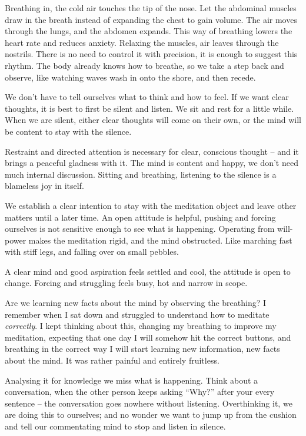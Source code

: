 Breathing in, the cold air touches the tip of the nose. Let the
abdominal muscles draw in the breath instead of expanding the chest to
gain volume. The air moves through the lungs, and the abdomen expands.
This way of breathing lowers the heart rate and reduces anxiety.
Relaxing the muscles, air leaves through the nostrils. There is no need
to control it with precision, it is enough to suggest this rhythm. The
body already knows how to breathe, so we take a step back and observe,
like watching waves wash in onto the shore, and then recede.

We don't have to tell ourselves what to think and how to feel. If we
want clear thoughts, it is best to first be silent and listen. We sit
and rest for a little while. When we are silent, either clear thoughts
will come on their own, or the mind will be content to stay with the
silence.

\enlargethispage*{\baselineskip}

Restraint and directed attention is necessary for clear, conscious
thought -- and it brings a peaceful gladness with it. The mind is
content and happy, we don't need much internal discussion. Sitting and
breathing, listening to the silence is a blameless joy in itself.

We establish a clear intention to stay with the meditation object and
leave other matters until a later time. An open attitude is helpful,
pushing and forcing ourselves is not sensitive enough to see what is
happening. Operating from will-power makes the meditation rigid, and the
mind obstructed. Like marching fast with stiff legs, and falling over on
small pebbles.

A clear mind and good aspiration feels settled and cool, the attitude is
open to change. Forcing and struggling feels busy, hot and narrow in
scope.


Are we learning new facts about the mind by observing the breathing? I
remember when I sat down and struggled to understand how to meditate
\emph{correctly}. I kept thinking about this, changing my breathing to
improve my meditation, expecting that one day I will somehow hit the
correct buttons, and breathing in the correct way I will start learning
new information, new facts about the mind. It was rather painful and
entirely fruitless.

Analysing it for knowledge we miss what is happening. Think about a
conversation, when the other person keeps asking ``Why?'' after your
every sentence -- the conversation goes nowhere without listening.
Overthinking it, we are doing this to ourselves; and no wonder we want
to jump up from the cushion and tell our commentating mind to stop and
listen in silence.

